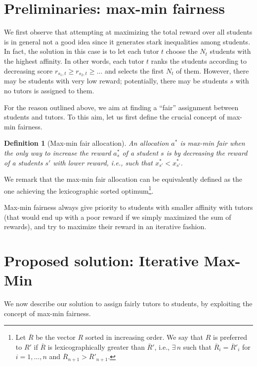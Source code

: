 \documentclass[11pt,oneside,a4paper]{article}     %
\newtheorem{definition}{Definition}
\begin{document}
\section{Preliminaries: max-min fairness}

We first observe that attempting at maximizing the total reward over all students is in general not a good idea since it generates stark inequalities among students. In fact, the solution in this case is to let each tutor $t$ choose the $N_t$ students with the highest affinity. In other words, each tutor $t$ ranks the students according to decreasing score $r_{s_1,t}\ge r_{s_2,t} \ge \dots$ and selects the first $N_t$ of them. However, there may be students with very low reward; potentially, there may be students $s$ with no tutors is assigned to them.


For the reason outlined above, we aim at finding a ``fair'' assignment between students and tutors. To this aim, let us first define the crucial concept of max-min fairness.

\begin{definition}[Max-min fair allocation] \cite{nace2008max}
An allocation $a^*$ is max-min fair when the only way to increase the reward $a_s^*$ of a student $s$ is by decreasing the reward of a students $s'$ with lower reward, i.e., such that $x^*_{s'}< x^*_{s'}$.
\end{definition}

We remark that the max-min fair allocation can be equivalently defined as the one achieving the lexicographic sorted optimum\footnote{Let $\overline{R}$ be the vector $R$ sorted in increasing order. We say that $R$ is preferred to $R'$ if $\overline{R}$ is lexicographically greater than $\overline{R}'$, i.e., $\exists \, n$ such that $\overline{R}_i=\overline{R}'_i$ for $i=1,\dots,n$ and $\overline{R}_{n+1}>\overline{R}'_{n+1}$.}.

Max-min fairness always give priority to students with smaller affinity with tutors (that would end up with a poor reward if we simply maximized the sum of rewards), and try to maximize their reward in an iterative fashion.






\section{Proposed solution: Iterative Max-Min}

We now describe our solution to assign fairly tutors to students, by exploiting the concept of max-min fairness.
\end{document}
